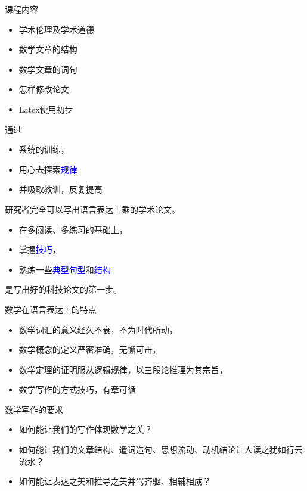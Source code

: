 \documentclass[10pt]{ctexbeamer}
\newcommand{\blue}[1]{\textcolor{blue}{#1}}
\begin{document}
\begin{frame}{课程内容}
		\begin{itemize}
		\item 学术伦理及学术道德

		\item 数学文章的结构

		\item 数学文章的词句

		\item 怎样修改论文

		\item Latex使用初步

	\end{itemize}

\end{frame}


\begin{frame}
	通过
		\begin{itemize}
		\item  系统的训练，
		\item 用心去探索\blue{规律}
		\item 并吸取教训，反复提高
	\end{itemize}
研究者完全可以写出语言表达上乘的学术论文。


\vspace{15pt}

\begin{itemize}
	\item 在多阅读、多练习的基础上，
	\item 掌握\blue{技巧}，
	\item 熟练一些\blue{典型句型}和\blue{结构}
\end{itemize}
是写出好的科技论文的第一步。
\end{frame}


\begin{frame}
	数学在语言表达上的特点
	\begin{itemize}
		\item 数学词汇的意义经久不衰，不为时代所动，
		\item 数学概念的定义严密准确，无懈可击，
		\item 数学定理的证明服从逻辑规律，以三段论推理为其宗旨，
		\item 数学写作的方式技巧，有章可循
	\end{itemize}
\vspace{15pt}
\pause
	数学写作的要求
\begin{itemize}
	\item 如何能让我们的写作体现数学之美？
	\item 如何能让我们的文章结构、遣词造句、思想流动、动机结论让人读之犹如行云流水？
	\item 如何能让表达之美和推导之美并驾齐驱、相辅相成？
\end{itemize}
\end{frame}
\end{document}
